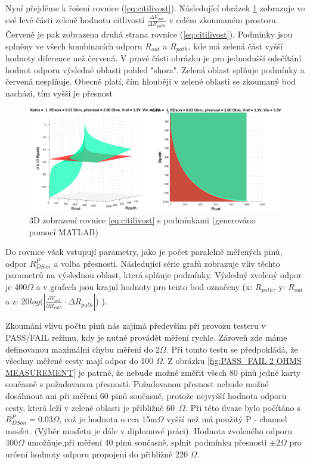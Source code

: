 Nyní přejděme k řešení rovnice (\ref{eq:citilivost}). Následující obrázek \ref{fig: zobrazení df/dRpath}
zobrazuje ve své levé části zeleně hodnotu citlivostí $\frac{ \Delta V_{out} }{\Delta R_{path}}$
v celém zkoumaném prostoru. Červeně je pak zobrazena druhá strana rovnice (\ref{eq:citilivost}).
Podmínky jsou splněny ve všech kombinacích odporu $R_{out}$ a $R_{path}$, kde má zelená část
vyšší hodnoty diference než červená.
V pravé části obrázku je pro jednodušší odečítání hodnot odporu výsledné oblasti pohled "shora".
Zelená oblast splňuje podmínky a červená nesplňuje.
Obecně platí, čím hlouběji v zelené oblasti se zkoumaný bod nachází, tím vyšší je přesnost\\

\begin{figure}[ht!]
    \centering
    \includegraphics[width = 1\textwidth]{obrazky/general_dVF.eps}
    \caption{3D zobrazení rovnice \ref{eq:citilivost} s podmínkami (generováno pomocí MATLAB)}
    \label{fig: zobrazení df/dRpath}
\end{figure}

Do rovnice však vstupují parametry, jako je počet paralelně měřených pinů,
odpor $R^P_{DSon}$ a volba přesnosti. Následující série grafů zobrazuje vliv
těchto parametrů na výslednou oblast, která splňuje podmínky.
Výsledný zvolený odpor je 400$\Omega$ a v grafech jsou krajní hodnoty pro tento bod označeny
(x: $R_{path}$, y: $R_{out}$ a  z: $20log(\left| \frac{\partial V_{out} }{\partial R_{path}}\cdot \Delta R_{path} \right|$) ).\\
\clearpage

Zkoumání vlivu počtu pinů nás zajímá především při provozu testeru v PASS/FAIL režimu,
kdy je nutné provádět měření rychle. Zároveň zde máme definovanou maximální chybu měření
do 2$\Omega$. Při tomto testu se předpokládá, že všechny měřené cesty mají odpor do 100 $\Omega$.
Z obrázku \ref{fig:PASS_FAIL 2 OHMS MEASUREMENT} je patrné, že nebude možné
změřit všech 80 pinů jedné karty současně s požadovanou přesností.
Požadovanou přesnost nebude možné dosáhnout ani při měření 60 pinů současně, protože nejvyšší hodnota odporu cesty,
která leží v zelené oblasti je přibližně 60\, $\Omega$.
Při této úvaze bylo počítáno s $R^P_{DSon} = 0.03\Omega$, což je hodnota o cca 15m$\Omega$ vyšší než má použitý P - channel mosfet.
(Výběr mosfetu je dále v diplomové práci).
Hodnota zvoleného odporu 400$\Omega$ umožňuje,při měření 40 pinů současně, splnit podmínku přesnosti $\pm 2\Omega$ pro určení hodnoty odporu propojení do přibližně 220
$\Omega$.\\



